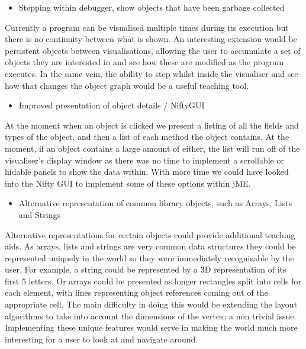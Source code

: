 \documentclass[11pt, a4paper]{report}
\begin{document}
\begin{itemize}
  \item Stepping within debugger, show objects that have been garbage collected
\end{itemize}

Currently a program can be visualised multiple times during its execution but there is no continuity between what is shown. An interesting extension would be persistent objects between visualisations, allowing the user to accumulate a set of objects they are interested in and see how these are modified as the program executes. In the same vein, the ability to step whilst inside the visualiser and see how that changes the object graph would be a useful teaching tool.

\begin{itemize}
  \item Improved presentation of object details / NiftyGUI
\end{itemize}

At the moment when an object is clicked we present a listing of all the fields and types of the object, and then a list of each method the object contains. At the moment, if an object contains a large amount of either, the list will run off of the visualiser’s display window as there was no time to implement a scrollable or hidable panels to show the data within. With more time we could have looked into the Nifty GUI to implement some of these options within jME.

\begin{itemize}
  \item Alternative representation of common library objects, such as Arrays, Lists and Strings
\end{itemize}

Alternative representations for certain objects could provide additional teaching aids. As arrays, lists and strings are very common data structures they could be represented uniquely in the world so they were immediately recognisable by the user. For example, a string could be represented by a 3D representation of its first 5 letters. Or arrays could be presented as longer rectangles split into cells for each element, with lines representing object references coming out of the appropriate cell. The main difficulty in doing this would be extending the layout algorithms to take into account the dimensions of the vertex; a non trivial issue. Implementing these unique features would serve in making the world much more interesting for a user to look at and navigate around.
\end{document}
